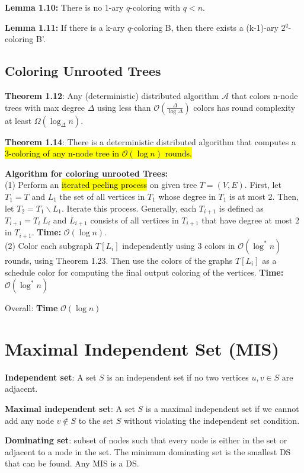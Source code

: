 \documentclass[a4paper, 8pt, landscape]{scrartcl}
\begin{document}
\begin{multicols*}{3}
\textbf{Lemma 1.10:} There is no 1-ary $q$-coloring with $q < n$.

\textbf{Lemma 1.11:} If there is a k-ary $q$-coloring B, then there exists a (k-1)-ary $2^q$-coloring B'.


\subsection{Coloring Unrooted Trees}

\textbf{Theorem 1.12}: Any (deterministic) distributed algorithm $\mathcal{A}$ that colors n-node trees with max degree $\Delta$ using less than $\mathcal{O}(\frac{\Delta}{\log \Delta})$ colors has round complexity at least $\Omega(\log_{\Delta}n)$.

\textbf{Theorem 1.14}: There is a deterministic distributed algorithm that computes a \hl{3-coloring of any n-node tree in $\mathcal{O}(\log n)$ rounds.}

\textbf{Algorithm for coloring unrooted Trees:}\\
(1) Perform an \hl{iterated peeling process} on given tree $T=(V,E)$. First, let $T_1 = T$ and $L_1$ the set of all vertices in $T_1$ whose degree in $T_1$ is at most 2. Then, let $T_2 = T_1 \backslash L_1$. Iterate this process. Generally, each $T_{i+1}$ is defined as $T_{i+1} = T_i \ L_i$ and $L_{i+1}$ consists of all vertices in $T_{i+1}$ that have degree at most 2 in $T_{i+1}$. \textbf{Time:} $\mathcal{O}(\log n)$.\\
(2) Color each subgraph $T[L_i]$ independently using 3 colors in $\mathcal{O}(\log^* n)$ rounds, using Theorem 1.23. Then use the colors of the graphs $T[L_i]$ as a schedule color for computing the final output coloring of the vertices. \textbf{Time:} $\mathcal{O}(\log^* n)$

Overall: \textbf{Time} $\mathcal{O}(\log n)$



\section{Maximal Independent Set (MIS)}

\textbf{Independent set}: A set $S$ is an independent set if no two vertices $u, v \in S$ are adjacent.

\textbf{Maximal independent set}: A set $S$ is a maximal independent set if we cannot add any node $v \notin S$ to the set $S$ without violating the independent set condition.

\textbf{Dominating set}: subset of nodes such that every node is either in the set or adjacent to a node in the set. The minimum dominating set is the smallest DS that can be found. Any MIS is a DS.


\end{multicols*}
\end{document}

